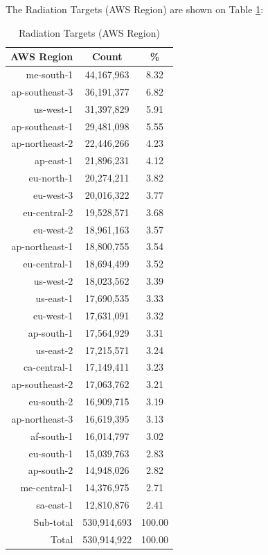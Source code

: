 \newpage
The Radiation Targets (AWS Region) are shown on Table \ref{tab:radiationtargets(awsregion)}:
\begin{table}[!h]
\begin{center}
\caption{Radiation Targets (AWS Region)}
\label{tab:radiationtargets(awsregion)}
\begin{tabular}{ |r|c|c| }
\hline
\centering AWS Region & Count & \%  \\
\hline
me-south-1 & 44,167,963 & 8.32  \\
ap-southeast-3 & 36,191,377 & 6.82  \\
us-west-1 & 31,397,829 & 5.91  \\
ap-southeast-1 & 29,481,098 & 5.55  \\
ap-northeast-2 & 22,446,266 & 4.23  \\
ap-east-1 & 21,896,231 & 4.12  \\
eu-north-1 & 20,274,211 & 3.82  \\
eu-west-3 & 20,016,322 & 3.77  \\
eu-central-2 & 19,528,571 & 3.68  \\
eu-west-2 & 18,961,163 & 3.57  \\
ap-northeast-1 & 18,800,755 & 3.54  \\
eu-central-1 & 18,694,499 & 3.52  \\
us-west-2 & 18,023,562 & 3.39  \\
us-east-1 & 17,690,535 & 3.33  \\
eu-west-1 & 17,631,091 & 3.32  \\
ap-south-1 & 17,564,929 & 3.31  \\
us-east-2 & 17,215,571 & 3.24  \\
ca-central-1 & 17,149,411 & 3.23  \\
ap-southeast-2 & 17,063,762 & 3.21  \\
eu-south-2 & 16,909,715 & 3.19  \\
ap-northeast-3 & 16,619,395 & 3.13  \\
af-south-1 & 16,014,797 & 3.02  \\
eu-south-1 & 15,039,763 & 2.83  \\
ap-south-2 & 14,948,026 & 2.82  \\
me-central-1 & 14,376,975 & 2.71  \\
sa-east-1 & 12,810,876 & 2.41  \\
\hline
Sub-total & 530,914,693 & 100.00  \\
\hline
Total & 530,914,922 & 100.00  \\
\hline
\end{tabular}
\end{center}
\end{table}

